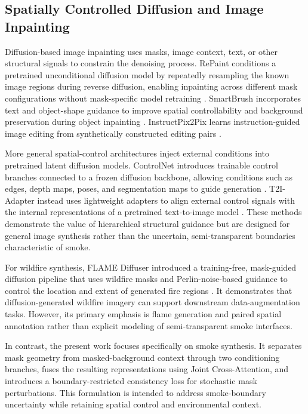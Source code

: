 \documentclass[journal]{IEEEtran}
\begin{document}
\subsection{Spatially Controlled Diffusion and Image Inpainting}
\label{subsec:related_controlled_diffusion}

Diffusion-based image inpainting uses masks, image context, text, or
other structural signals to constrain the denoising process. RePaint
conditions a pretrained unconditional diffusion model by repeatedly
resampling the known image regions during reverse diffusion, enabling
inpainting across different mask configurations without mask-specific
model retraining
\cite{lugmayr2022repaintinpaintingusingdenoising}. SmartBrush incorporates text and object-shape
guidance to improve spatial controllability and background preservation
during object inpainting
\cite{xie2022smartbrushtextshapeguided}. InstructPix2Pix learns instruction-guided
image editing from synthetically constructed editing pairs
\cite{brooks2023instructpix2pixlearningfollowimage}.

More general spatial-control architectures inject external conditions
into pretrained latent diffusion models. ControlNet introduces
trainable control branches connected to a frozen diffusion backbone,
allowing conditions such as edges, depth maps, poses, and segmentation
maps to guide generation
\cite{zhang2023addingconditionalcontroltexttoimage}. T2I-Adapter instead
uses lightweight adapters to align external control signals with the
internal representations of a pretrained text-to-image model
\cite{mou2023t2iadapterlearningadaptersdig}. These methods demonstrate
the value of hierarchical structural guidance but are designed for
general image synthesis rather than the uncertain, semi-transparent
boundaries characteristic of smoke.

For wildfire synthesis, FLAME Diffuser introduced a training-free,
mask-guided diffusion pipeline that uses wildfire masks and
Perlin-noise-based guidance to control the location and extent of
generated fire regions
\cite{wang2024flamediffuserwildfireimage}. It demonstrates that
diffusion-generated wildfire imagery can support downstream
data-augmentation tasks. However, its primary emphasis is flame
generation and paired spatial annotation rather than explicit modeling
of semi-transparent smoke interfaces.

In contrast, the present work focuses specifically on smoke synthesis.
It separates mask geometry from masked-background context through two
conditioning branches, fuses the resulting representations using Joint
Cross-Attention, and introduces a boundary-restricted consistency loss
for stochastic mask perturbations. This formulation is intended to
address smoke-boundary uncertainty while retaining spatial control and
environmental context.
\end{document}
